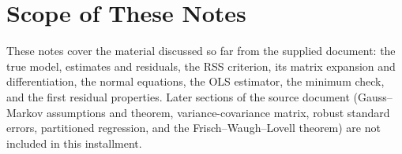 \documentclass[11pt,a4paper]{article}
\numberwithin{equation}{section}
\begin{document}
\section*{Scope of These Notes}
These notes cover the material discussed so far from the supplied document: the true model, estimates and residuals, the RSS criterion, its matrix expansion and differentiation, the normal equations, the OLS estimator, the minimum check, and the first residual properties. Later sections of the source document (Gauss--Markov assumptions and theorem, variance-covariance matrix, robust standard errors, partitioned regression, and the Frisch--Waugh--Lovell theorem) are not included in this installment.
\end{document}
